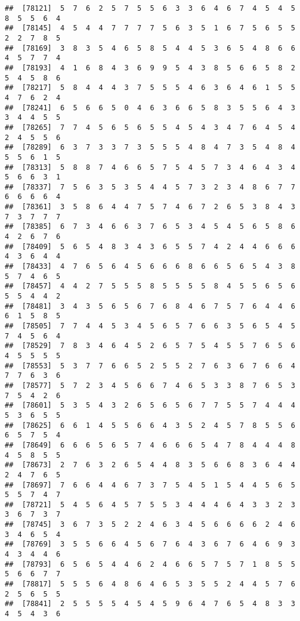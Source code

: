 \documentclass[
]{book}
\begin{document}
\begin{verbatim}
##  [78121]  5  7  6  2  5  7  5  5  6  3  3  6  4  6  7  4  5  4  5  8  5  5  6  4
##  [78145]  4  5  4  4  7  7  7  7  5  6  3  5  1  6  7  5  6  5  5  2  2  7  8  5
##  [78169]  3  8  3  5  4  6  5  8  5  4  4  5  3  6  5  4  8  6  6  4  5  7  7  4
##  [78193]  4  1  6  8  4  3  6  9  9  5  4  3  8  5  6  6  5  8  2  5  4  5  8  6
##  [78217]  5  8  4  4  4  3  7  5  5  5  4  6  3  6  4  6  1  5  5  4  7  6  2  4
##  [78241]  6  5  6  6  5  0  4  6  3  6  6  5  8  3  5  5  6  4  3  3  4  4  5  5
##  [78265]  7  7  4  5  6  5  6  5  5  4  5  4  3  4  7  6  4  5  4  2  4  5  5  6
##  [78289]  6  3  7  3  3  7  3  5  5  5  4  8  4  7  3  5  4  8  4  5  5  6  1  5
##  [78313]  5  8  8  7  4  6  6  5  7  5  4  5  7  3  4  6  4  3  4  5  6  6  3  1
##  [78337]  7  5  6  3  5  3  5  4  4  5  7  3  2  3  4  8  6  7  7  6  6  6  6  4
##  [78361]  3  5  8  6  4  4  7  5  7  4  6  7  2  6  5  3  8  4  3  7  3  7  7  7
##  [78385]  6  7  3  4  6  6  3  7  6  5  3  4  5  4  5  6  5  8  6  4  2  6  7  6
##  [78409]  5  6  5  4  8  3  4  3  6  5  5  7  4  2  4  4  6  6  6  4  3  6  4  4
##  [78433]  4  7  6  5  6  4  5  6  6  6  8  6  6  5  6  5  4  3  8  5  7  4  6  5
##  [78457]  4  4  2  7  5  5  5  8  5  5  5  5  8  4  5  5  6  5  6  5  5  4  4  2
##  [78481]  3  4  3  5  6  5  6  7  6  8  4  6  7  5  7  6  4  4  6  6  1  5  8  5
##  [78505]  7  7  4  4  5  3  4  5  6  5  7  6  6  3  5  6  5  4  5  7  4  5  6  4
##  [78529]  7  8  3  4  6  4  5  2  6  5  7  5  4  5  5  7  6  5  6  4  5  5  5  5
##  [78553]  5  3  7  7  6  6  5  2  5  5  2  7  6  3  6  7  6  6  4  7  7  6  3  6
##  [78577]  5  7  2  3  4  5  6  6  7  4  6  5  3  3  8  7  6  5  3  7  5  4  2  6
##  [78601]  5  3  5  4  3  2  6  5  6  5  6  7  7  5  5  7  4  4  4  5  3  6  5  5
##  [78625]  6  6  1  4  5  5  6  6  4  3  5  2  4  5  7  8  5  5  6  6  5  7  5  4
##  [78649]  6  6  6  5  6  5  7  4  6  6  6  5  4  7  8  4  4  4  8  4  5  8  5  5
##  [78673]  2  7  6  3  2  6  5  4  4  8  3  5  6  6  8  3  6  4  4  2  4  7  6  5
##  [78697]  7  6  6  4  4  6  7  3  7  5  4  5  1  5  4  4  5  6  5  5  5  7  4  7
##  [78721]  5  4  5  6  4  5  7  5  5  3  4  4  4  6  4  3  3  2  3  3  6  7  3  7
##  [78745]  3  6  7  3  5  2  2  4  6  3  4  5  6  6  6  6  2  4  6  3  4  6  5  4
##  [78769]  3  5  5  6  6  4  5  6  7  6  4  3  6  7  6  4  6  9  3  4  3  4  4  6
##  [78793]  6  5  6  5  4  4  6  2  4  6  6  5  7  5  7  1  8  5  5  5  6  6  7  7
##  [78817]  5  5  5  6  4  8  6  4  6  5  3  5  5  2  4  4  5  7  6  2  5  6  5  5
##  [78841]  2  5  5  5  5  4  5  4  5  9  6  4  7  6  5  4  8  3  3  4  5  4  3  6

\end{verbatim}
\end{document}
